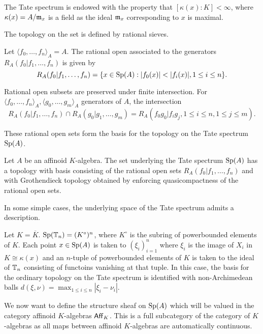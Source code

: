 \begin{remark}
    The Tate spectrum is endowed with the property that $[\kappa(x):K]<\infty$, where $\kappa(x)=A/\mathfrak{m}_{x}$ is a field as the ideal $\mathfrak{m}_{x}$ corresponding to $x$ is maximal. 
\end{remark}
The topology on the set is defined by rational sieves. 
\begin{definition}\label{def: rational set}
    Let $\langle f_{0},\dots,f_{n}\rangle_{A}=A$. The rational open associated to the generators $R_{A}(f_{0}|f_{1},\dots,f_{n})$ is given by 
    $$R_{A}(f_{0}|f_{1},\dots,f_{n})=\{x\in\Sp(A):|f_{0}(x)|<|f_{i}(x)|,1\leq i\leq n\}.$$
\end{definition}
\begin{remark}
    Rational open subsets are preserved under finite intersection. For $\langle f_{0},\dots,f_{n}\rangle_{A},\langle g_{0},\dots,g_{m}\rangle_{A}$ generators of $A$, the intersection 
    $$R_{A}(f_{0}|f_{1},\dots,f_{n})\cap R_{A}(g_{0}|g_{1},\dots,g_{m})=R_{A}(f_{0}g_{0}|f_{i}g_{j}, 1\leq i\leq n, 1\leq j\leq m).$$
\end{remark}
These rational open sets form the basis for the topology on the Tate spectrum $\mathrm{Sp}(A)$. 
\begin{definition}\label{def: topology of Tate spectrum}
    Let $A$ be an affinoid $K$-algebra. The set underlying the Tate spectrum $\mathrm{Sp}(A)$ has a topology with basis consisting of the rational open sets $R_{A}(f_{0}|f_{1},\dots,f_{n})$ and with Grothendieck topology obtained by enforcing quasicompactness of the rational open sets. 
\end{definition}
In some simple cases, the underlying space of the Tate spectrum admits a description. 
\begin{example}
    Let $K=\overline K$. $\mathrm{Sp}(\mathbb{T}_{n})= (K^{\circ})^{n}$, where $K^{\circ}$ is the subring of powerbounded elements of $K$. Each point $x\in\mathrm{Sp}(A)$ is taken to $(\xi_{i})_{i=1}^{n}$ where $\xi_{i}$ is the image of $X_{i}$ in $K\cong\kappa(x)$ and an $n$-tuple of powerbounded elements of $K$ is taken to the ideal of $\mathbb{T}_{n}$ consisting of functoins vanishing at that tuple. In this case, the basis for the ordinary topology on the Tate spectrum is identified with non-Archimedean balls $d(\xi,\nu)=\max_{1\leq i\leq n}|\xi_{i}-\nu_{i}|$. 
\end{example}
We now want to define the structure sheaf on $\mathrm{Sp}(A)$ which will be valued in the category affinoid $K$-algebras $\mathsf{Aff}_{K}$. This is a full subcategory of the category of $K$-algebras as all maps between affinoid $K$-algebras are automatically continuous. 

